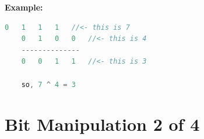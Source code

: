 \documentclass[12pt]{article}
\begin{document}
\begin{itemize}
\begin{itemize}
\begin{itemize}
            \bigskip

            \textbf{Example:}

            \bigskip

    \begin{lstlisting}[language=c]
    0   1   1   1   //<- this is 7
    0   1   0   0   //<- this is 4
    --------------
    0   0   1   1   //<- this is 3

    so, 7 ^ 4 = 3
    \end{lstlisting}
        \end{itemize}
    \end{itemize}
\end{itemize}

\bigskip

\section*{Bit Manipulation 2 of 4}

\bigskip
\end{document}
